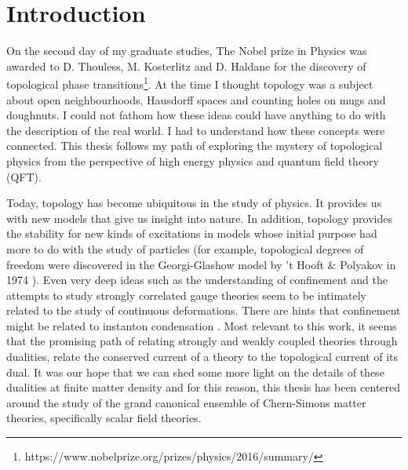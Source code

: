 
    \graphicspath{{Introduction_Folder/figures/PNG/}{Introduction_Folder/figures/PDF/}{Introduction_Folder/figures/}}

\chapter*{Introduction}


On the second day of my graduate studies, The Nobel prize in Physics was awarded to D. Thouless, M. Kosterlitz and D. Haldane for the discovery of topological phase transitions\footnote{https://www.nobelprize.org/prizes/physics/2016/summary/}. At the time I thought topology was a subject about open neighbourhoods, Hausdorff spaces and counting holes on mugs and doughnuts. I could not fathom how these ideas could have anything to do with the description of the real world. I had to understand how these concepts were connected. This thesis follows my path of exploring the mystery of topological physics from the perspective of high energy physics and quantum field theory (QFT).

Today, topology has become ubiquitous in the study of physics. It provides us with new models that give us insight into nature. In addition, topology provides the stability for new kinds of excitations in models whose initial purpose had more to do with the study of particles (for example, topological degrees of freedom were discovered in the Georgi-Glashow model \cite{Georgi:1974sy} by 't Hooft \& Polyakov in 1974 \cite{Polyakov:1974ek, tHooft:1974kcl}). Even very deep ideas such as the understanding of confinement and the attempts to study strongly correlated gauge theories seem to be intimately related to the study of continuous deformations. There are hints that confinement might be related to instanton condensation \cite{Polyakov:1976fu}. Most relevant to this work, it seems that the promising path of relating strongly and weakly coupled theories through dualities, relate the conserved current of a theory to the topological current of its dual. It was our hope that we can shed some more light on the details of these dualities at finite matter density and for this reason, this thesis has been centered around the study of the grand canonical ensemble of Chern-Simons matter theories, specifically scalar field theories.

